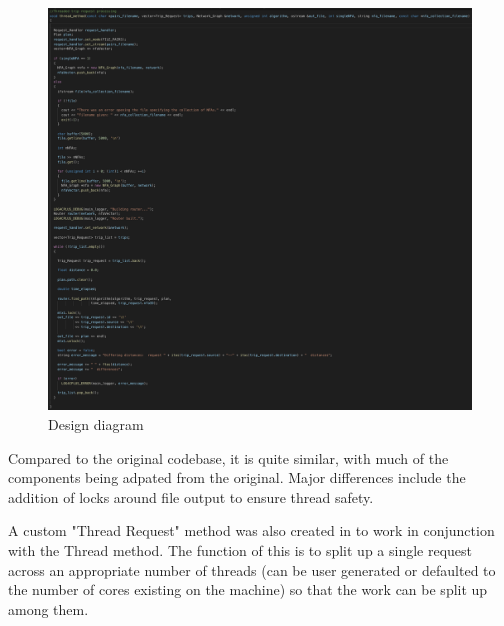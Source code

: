\documentclass[English]{article}
\theoremstyle{remark}
\numberwithin{equation}{section}
\begin{document}
\begin{figure}
    \centering
    \includegraphics[scale = 0.7]{Code.png}
    \caption{Design diagram}
    \label{fig:code1}
\end{figure}
Compared to the original codebase, it is quite similar, with much of the components being adpated from the original. Major differences include the addition of locks around file output to ensure thread safety.

A custom "Thread Request" method was also created in to work in conjunction with the Thread method. The function of this is to split up a single request across an appropriate number of threads (can be user generated or defaulted to the number of cores existing on the machine) so that the work can be split up among them.
\end{document}
